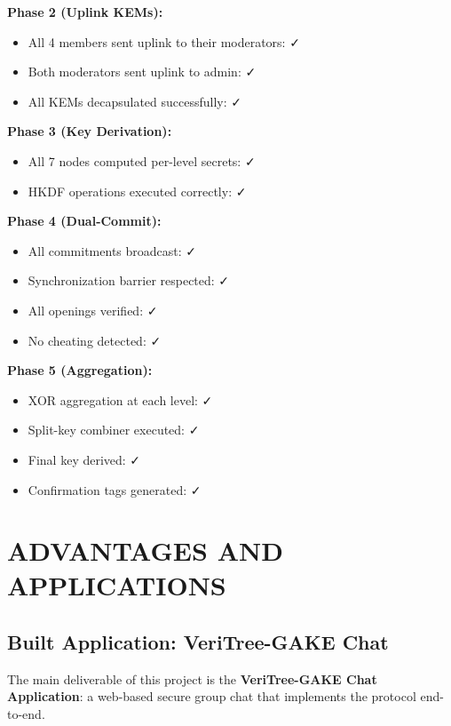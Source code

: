 \documentclass[12pt,a4paper]{report}
\begin{document}
\textbf{Phase 2 (Uplink KEMs):}
\begin{itemize}
\item All 4 members sent uplink to their moderators: ✓
\item Both moderators sent uplink to admin: ✓
\item All KEMs decapsulated successfully: ✓
\end{itemize}

\textbf{Phase 3 (Key Derivation):}
\begin{itemize}
\item All 7 nodes computed per-level secrets: ✓
\item HKDF operations executed correctly: ✓
\end{itemize}

\textbf{Phase 4 (Dual-Commit):}
\begin{itemize}
\item All commitments broadcast: ✓
\item Synchronization barrier respected: ✓
\item All openings verified: ✓
\item No cheating detected: ✓
\end{itemize}

\textbf{Phase 5 (Aggregation):}
\begin{itemize}
\item XOR aggregation at each level: ✓
\item Split-key combiner executed: ✓
\item Final key derived: ✓
\item Confirmation tags generated: ✓
\end{itemize}



\chapter{ADVANTAGES AND APPLICATIONS}

\section{Built Application: VeriTree-GAKE Chat}

The main deliverable of this project is the \textbf{VeriTree-GAKE Chat Application}: a web-based secure group chat that implements the protocol end-to-end.
\end{document}
